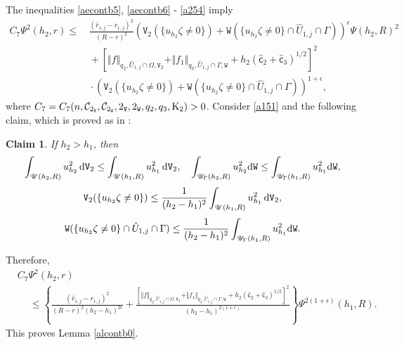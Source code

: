 \documentclass[reqno, 11pt, a4paper]{amsart}
\newtheorem{cl}{Claim}
\numberwithin{equation}{section}
\newcommand{\xv}{2_{\mathtt{V}}}
\newcommand{\xw}{2_{\mathtt{W}}}
\newcommand{\ck}{\textnormal K}
\newcommand{\fc}{\mathsf c}
\newcommand{\wghtv}{\mathtt{V}}
\newcommand{\wghtw}{\mathtt{W}}
\newcommand{\dwv}{\textnormal{d} \mathtt{V}}
\newcommand{\dww}{\textnormal{d} \mathtt{W}}
\newcommand{\qxp}{q}
\begin{document}
 
The inequalities \eqref{aecontb5}, \eqref{aecontb6} - \eqref{a254} imply
\begin{equation}\label{a151}
\begin{split}
C_{7} \Psi ^2 (h_{2} , r ) \leq & \, \displaystyle   \frac{ (\hat{r}_{1, j}-r_{1, j})^2}{(R-r)^2} \left(   \wghtv _2 (\{u_{h_{2}}  \zeta \neq 0 \})  +\wghtw ( \{u_{h_{2}}  \zeta \neq 0 \}\cap \hat U _{1,j} \cap \Gamma) \right)^{\epsilon }\Psi ( h_{2}, R ) ^2 \\[3pt]
& \, \displaystyle + \left[  \Vert f \Vert _{q_2 , \hat U _{1,j} \cap \Omega  , \wghtv _2 } +  \Vert f_1 \Vert _{q_3 , \hat U _{1,j} \cap \Gamma , \wghtw}  + h_{2} (\widehat{\fc}_2+\widehat{\fc}_3 )^{1/2} \right]^2 \\[3pt]
& \, \displaystyle \cdot \left( \wghtv _2 (\{u_{h_{2}}  \zeta \neq 0 \})  +\wghtw ( \{u_{h_{2}}  \zeta \neq 0 \}\cap \hat U _{1,j} \cap \Gamma) \right)^{1+\epsilon },
\end{split}
\end{equation}
where $C_{7}= C_{7} (  n , \mathcal C_{\xv} , \mathcal C_{\xw}  , \xv , \xw , \qxp _2 , \qxp _3 , \ck _{2}) >0$. Consider \eqref{a151} and the following claim, which is proved as in \cite{hanlin2011ellipticpartial}:
\begin{cl}
If $h_{2}>h_{1} $, then
\begin{gather*}
\int _{\mathscr{U}(h_{2},R)} u_{h_{2}}  ^2 \,  \dwv _2  \leq \int _{\mathscr{U} (h_{1} ,R)} u_{h_{1}}   ^2 \, \dwv _2  , \quad \int _{\mathscr{U} _{\Gamma } (h_{2},R)}  u_{h_{2}}  ^2   \dww  \leq \int _{\mathscr{U} _{\Gamma }  (h_{1} ,R)} u_{h_{1}}   ^2  \dww  ,\\[3pt]
 \wghtv _2 ( \{u_{h_{2}}  \zeta  \neq 0\} ) \leq  \frac{1}{(h_{2}-h_{1} )^2}\int _{\mathscr{U}(h_{1} ,R)} u_{h_{1}}   ^2\, \dwv _2, \\[3pt]
  \wghtw ( \{ u_{h_{2}}  \zeta \neq 0\} \cap \hat U _{1,j} \cap \Gamma ) \leq  \frac{1}{(h_{2}-h_{1} )^2}\int _{\mathscr{U}_{\Gamma } (h_{1} ,R)} u_{h_{1}}   ^2  \dww .
\end{gather*}
\end{cl}
\noindent Therefore,
\begin{align*}
& C_7 \Psi ^2 (h_{2},r) \\
& \quad \ \leq  \left\{ \frac{ (\hat r _{1,j} - r_{1,j})^2}{(R-r) ^{2}(h_{2}-h_{1} )^{2\epsilon }}  + \frac{  [  \Vert f \Vert _{q_2  ,  \hat U _{1,j} \cap \Omega  , \wghtv _2}  +  \Vert f_1 \Vert _{q_3 , \hat U _{1,j} \cap \Gamma , \wghtw} + h_{2} (\widehat{\fc}_2+\widehat{\fc}_3 )^{1/2}   ]^2}{(h_{2}-h_{1} )^{2(1+\epsilon )}}\right\} \Psi ^{2(1 + \epsilon  )} (h_{1} ,R).
\end{align*}
This proves Lemma \ref{alcontb0}.
\end{document}
